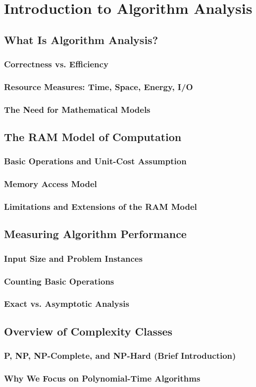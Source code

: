 \chapter{Introduction to Algorithm Analysis}
\section{What Is Algorithm Analysis?}
\subsection{Correctness vs. Efficiency}
\subsection{Resource Measures: Time, Space, Energy, I/O}
\subsection{The Need for Mathematical Models}

\section{The RAM Model of Computation}
\subsection{Basic Operations and Unit-Cost Assumption}
\subsection{Memory Access Model}
\subsection{Limitations and Extensions of the RAM Model}

\section{Measuring Algorithm Performance}
\subsection{Input Size and Problem Instances}
\subsection{Counting Basic Operations}
\subsection{Exact vs. Asymptotic Analysis}

\section{Overview of Complexity Classes}
\subsection{P, NP, NP-Complete, and NP-Hard (Brief Introduction)}
\subsection{Why We Focus on Polynomial-Time Algorithms}
